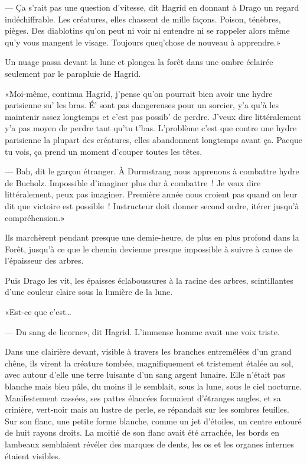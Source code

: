 --- Ça s'rait pas une question d'vitesse, dit Hagrid en donnant à Drago un regard indéchiffrable. Les créatures, elles chassent de mille façons. Poison, ténèbres, pièges. Des diablotins qu'on peut ni voir ni entendre ni se rappeler alors même qu'y vous mangent le visage. Toujours queq'chose de nouveau à apprendre.»

Un nuage passa devant la lune et plongea la forêt dans une ombre éclairée seulement par le parapluie de Hagrid.

«Moi-même, continua Hagrid, j'pense qu'on pourrait bien avoir une hydre parisienne su' les bras. É' sont pas dangereuses pour un sorcier, y'a qu'à les maintenir assez longtemps et c'est pas possib' de perdre. J'veux dire littéralement y'a pas moyen de perdre tant qu'tu t'bas. L'problème c'est que contre une hydre parisienne la plupart des créatures, elles abandonnent longtemps avant ça. Pacque tu vois, ça prend un moment d'couper toutes les têtes.

--- Bah, dit le garçon étranger. À Durmstrang nous apprenons à combattre hydre de Bucholz. Impossible d'imaginer plus dur à combattre~! Je veux dire littéralement, peux pas imaginer. Première année nous croient pas quand on leur dit que victoire est possible~! Instructeur doit donner second ordre, itérer jusqu'à compréhension.»

Ils marchèrent pendant presque une demie-heure, de plus en plus profond dans la Forêt, jusqu'à ce que le chemin devienne presque impossible à suivre à cause de l'épaisseur des arbres.

Puis Drago les vit, les épaisses éclaboussures à la racine des arbres, scintillantes d'une couleur claire sous la lumière de la lune.

«Est-ce que c'est…

--- Du sang de licorne», dit Hagrid. L'immense homme avait une voix triste.

Dans une clairière devant, visible à travers les branches entremêlées d'un grand chêne, ils virent la créature tombée, magnifiquement et tristement étalée au sol, avec autour d'elle une terre luisante d'un sang argent lunaire. Elle n'était pas blanche mais bleu pâle, du moins il le semblait, sous la lune, sous le ciel nocturne. Manifestement cassées, ses pattes élancées formaient d'étranges angles, et sa crinière, vert-noir mais au lustre de perle, se répandait sur les sombres feuilles. Sur son flanc, une petite forme blanche, comme un jet d'étoiles, un centre entouré de huit rayons droits. La moitié de son flanc avait été arrachée, les bords en lambeaux semblaient révéler des marques de dents, les os et les organes internes étaient visibles.

